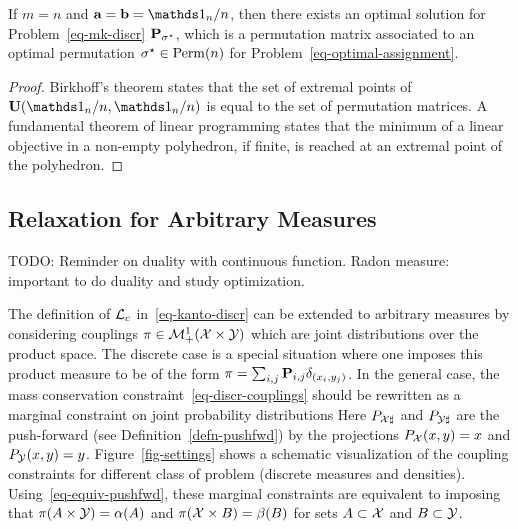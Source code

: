 \begin{prop}\label{prop-matching-kanto}
	If $m=n$ and $\a=\b=\ones_n/n$, then there exists an optimal solution for Problem~\eqref{eq-mk-discr} $\mathrm{\textbf{\upshape P}}_{\sigma^\star}$, which is a permutation matrix associated to an optimal permutation $\sigma^\star \in \mathrm{Perm}(n)$ for Problem~\eqref{eq-optimal-assignment}.	
\end{prop}

\begin{proof}
	Birkhoff's theorem states that the set of extremal points of $\CouplingsD(\ones_n/n,\ones_n/n)$ is equal to the set of permutation matrices. A fundamental theorem of linear programming
	\cite[Theorem 2.7]{bertsimas1997introduction} 
	states that the minimum of a linear objective in a non-empty polyhedron, if finite, is reached at an extremal point of the polyhedron.
\end{proof}




\subsection{Relaxation for Arbitrary Measures}

TODO: Reminder on duality with continuous function.
  Radon measure: important to do duality and study optimization.


The definition of $\mathcal{L}_c$ in~\eqref{eq-kanto-discr} can be extended to arbitrary measures by considering couplings $\pi \in \mathcal{M}_+^1(\mathcal{X} \times \mathcal{Y})$ which are joint distributions over the product space. The discrete case is a special situation where one imposes this product measure to be of the form $\pi = \sum_{i,j} \mathrm{\textbf{\upshape P}}_{i,j} \delta_{(x_i,y_j)}$. In the general case, the mass conservation constraint~\eqref{eq-discr-couplings} should be rewritten as a marginal constraint on joint probability distributions
Here $P_{\mathcal{X}\sharp}$ and $P_{\mathcal{Y}\sharp}$ are the push-forward (see Definition~\ref{defn-pushfwd}) by the projections $P_{\mathcal{X}}(x,y)=x$ and $P_{\mathcal{Y}}(x,y)=y$.
%
Figure~\ref{fig-settings} shows a schematic visualization of the coupling constraints for different class of problem (discrete measures and densities).
%
Using~\eqref{eq-equiv-pushfwd}, these marginal constraints are equivalent to imposing that $\pi(A \times \mathcal{Y})=\alpha(A)$ and $\pi(\mathcal{X} \times B)=\beta(B)$ for sets $A \subset \mathcal{X}$ and $B \subset \mathcal{Y}$.


